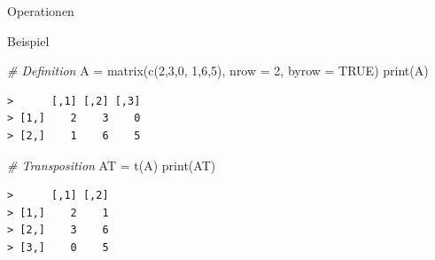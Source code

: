\documentclass[
  8pt,
  ignorenonframetext,
]{beamer}
\newenvironment{Shaded}{\begin{snugshade}}{\end{snugshade}}
\newcommand{\AttributeTok}[1]{\textcolor[rgb]{0.77,0.63,0.00}{#1}}
\newcommand{\CommentTok}[1]{\textcolor[rgb]{0.56,0.35,0.01}{\textit{#1}}}
\newcommand{\ConstantTok}[1]{\textcolor[rgb]{0.00,0.00,0.00}{#1}}
\newcommand{\DecValTok}[1]{\textcolor[rgb]{0.00,0.00,0.81}{#1}}
\newcommand{\FunctionTok}[1]{\textcolor[rgb]{0.00,0.00,0.00}{#1}}
\newcommand{\NormalTok}[1]{#1}
\newcommand{\OtherTok}[1]{\textcolor[rgb]{0.56,0.35,0.01}{#1}}
\begin{document}
\begin{frame}[fragile]{Operationen}
\protect\hypertarget{operationen-12}{}
\small

Beispiel \vspace{5mm}

\footnotesize

\begin{Shaded}
\begin{Highlighting}[]
\CommentTok{\# Definition}
\NormalTok{A }\OtherTok{=} \FunctionTok{matrix}\NormalTok{(}\FunctionTok{c}\NormalTok{(}\DecValTok{2}\NormalTok{,}\DecValTok{3}\NormalTok{,}\DecValTok{0}\NormalTok{,}
             \DecValTok{1}\NormalTok{,}\DecValTok{6}\NormalTok{,}\DecValTok{5}\NormalTok{),}
           \AttributeTok{nrow =} \DecValTok{2}\NormalTok{,}
           \AttributeTok{byrow =} \ConstantTok{TRUE}\NormalTok{)}
\FunctionTok{print}\NormalTok{(A)}
\end{Highlighting}
\end{Shaded}

\begin{verbatim}
>      [,1] [,2] [,3]
> [1,]    2    3    0
> [2,]    1    6    5
\end{verbatim}

\vspace{5mm}

\footnotesize

\begin{Shaded}
\begin{Highlighting}[]
\CommentTok{\# Transposition}
\NormalTok{AT }\OtherTok{=} \FunctionTok{t}\NormalTok{(A)}
\FunctionTok{print}\NormalTok{(AT)}
\end{Highlighting}
\end{Shaded}

\begin{verbatim}
>      [,1] [,2]
> [1,]    2    1
> [2,]    3    6
> [3,]    0    5
\end{verbatim}
\end{frame}
\end{document}
